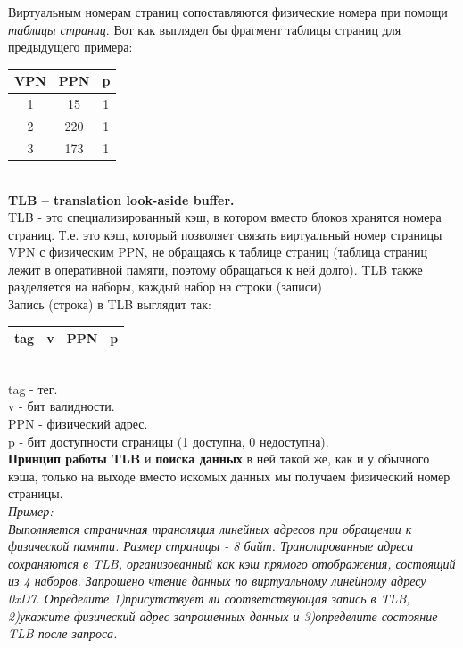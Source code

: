 \documentclass[12pt, letterpaper]{article}
\begin{document}
Виртуальным номерам страниц сопоставляются физические номера при помощи \textit{таблицы страниц}. Вот как выглядел бы фрагмент таблицы страниц для предыдущего примера:\\

\begin{minipage}{.2\textwidth}
    \begin{tabular}{|c|c|c|}
        \hline
        VPN & PPN & p\\
        \hline
        1 & 15 & 1\\
        \hline
        2 & 220 & 1\\
        \hline
        3 & 173 & 1\\
        \hline
    \end{tabular}
\end{minipage}\\

 \textbf{TLB – translation look-aside buffer.}\\
 TLB - это специализированный кэш, в котором вместо блоков хранятся номера страниц. Т.е. это кэш, который позволяет связать виртуальный номер страницы VPN с физическим PPN, не обращаясь к таблице страниц (таблица страниц лежит в оперативной памяти, поэтому обращаться к ней долго). TLB также разделяется на наборы, каждый набор на строки (записи)\\
 Запись (строка) в TLB выглядит так:\\
 \begin{tabular}{|c|c|c|c|}
    \hline
    tag & v & PPN & p\\
    \hline
 \end{tabular}\\
 tag - тег.\\
 v - бит валидности.\\
 PPN - физический адрес.\\
 p - бит доступности страницы (1 доступна, 0 недоступна).\\
 
 \textbf{Принцип работы TLB} и \textbf{поиска данных} в ней такой же, как и у обычного кэша, только на выходе вместо искомых данных мы получаем физический номер страницы.\\
 
 \textit{Пример:}\\
 \textit{Выполняется страничная трансляция линейных адресов при обращении
к физической памяти. Размер страницы - 8 байт. Транслированные адреса
сохраняются в TLB, организованный как кэш прямого отображения, состоящий из 4 наборов. Запрошено чтение данных по виртуальному линейному адресу 0xD7. Определите 1)присутствует ли соответствующая запись в TLB, 2)укажите физический адрес запрошенных данных и 3)определите состояние TLB после запроса.}\\
\end{document}
